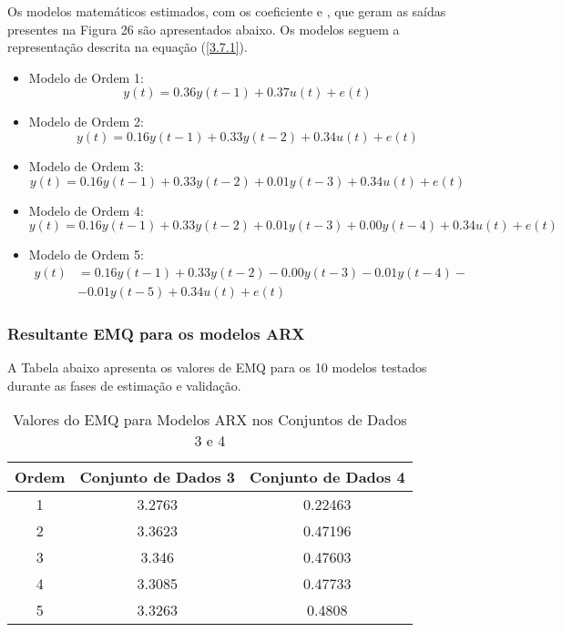\documentclass[a4paper,12pt]{article}
\begin{document}
Os modelos matemáticos estimados, com os coeficiente  e , que geram as saídas presentes na Figura 26 são apresentados abaixo. Os modelos seguem a representação descrita na equação (\ref{3.7.1}).

\begin{itemize}
    \item Modelo de Ordem 1:
    \begin{equation*}
    y(t) = 0.36y(t-1) + 0.37u(t) + e(t)
    \end{equation*}
    
    \item Modelo de Ordem 2:
    \begin{equation*}
    y(t) = 0.16y(t-1) + 0.33y(t-2) + 0.34u(t) + e(t)
    \end{equation*}
    
    \item Modelo de Ordem 3:
    \begin{equation*}
    y(t) = 0.16y(t-1) + 0.33y(t-2) + 0.01y(t-3) + 0.34u(t) + e(t)
    \end{equation*}
    
    \item Modelo de Ordem 4:
    \begin{equation*}
    y(t) = 0.16y(t-1) + 0.33y(t-2) + 0.01y(t-3) + 0.00y(t-4) + 0.34u(t) + e(t)
    \end{equation*}
    
    \item Modelo de Ordem 5:
    \begin{align*}
    y(t) &= 0.16y(t-1) + 0.33y(t-2) - 0.00y(t-3) - 0.01y(t-4) - \\
    &- 0.01y(t-5) + 0.34u(t) + e(t)
    \end{align*}
\end{itemize}

\subsubsection{Resultante EMQ para os modelos ARX}

A Tabela abaixo apresenta os valores de EMQ para os 10 modelos testados durante as fases de estimação e validação.
\begin{table}[h!]
    \centering
    \label{tab:emq_results_armax}
    \begin{tabular}{|c|c|c|}
        \hline
        Ordem & Conjunto de Dados 3 & Conjunto de Dados 4 \\
        \hline
        1 & 3.2763 & 0.22463 \\
        2 & 3.3623 & 0.47196 \\
        3 & 3.346 & 0.47603 \\
        4 & 3.3085 & 0.47733 \\
        5 & 3.3263 & 0.4808 \\
        \hline
    \end{tabular}
    \caption{Valores do EMQ para Modelos ARX nos Conjuntos de Dados 3 e 4}
\end{table}
\end{document}
